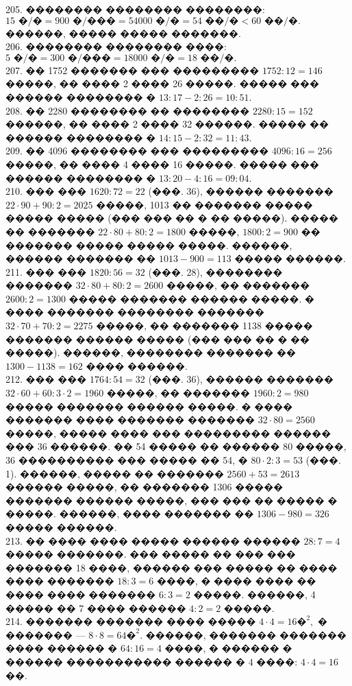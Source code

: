 \documentclass[12pt]{article}
\begin{document}
205. �������� �������� ��������: $15\text{ �/�}=900\text{ �/���}=54000\text{ �/�}=54\text{ ��/�}<60\text{ ��/�}.$ ������, ����� ����� �������.\\
206. �������� �������� ����: $5\text{ �/�}=300\text{ �/���}=18000\text{ �/�}=18\text{ ��/�}.$\\
207. �� 1752 ������� ��� ��������� $1752:12=146$ �����, �� ���� 2 ���� 26 �����. ����� ��� ������ �������� �  $13:17-2:26=10:51.$\\
208. �� 2280 �������� �� �������� $2280:15=152$ ������, �� ���� 2 ���� 32 ������. ����� �� ������ �������� �  $14:15-2:32=11:43.$\\
209. �� 4096 �������� ��� ��������� $4096:16=256$ �����, �� ���� 4 ���� 16 �����. ����� ��� ������ �������� �  $13:20-4:16=09:04.$\\
210. ��� ��� $1620:72=22$ (���. 36), ������ ������� $22\cdot90+90:2=2025$ �����, 1013 �� ������� ����� ����� ����� (��� ��� �� � �� �����). ����� �� ������� $22\cdot80+80:2=1800$ �����, $1800:2=900$ �� ������� ����� ����� �����. ������, ������ ������� �� $1013-900=113$ ����� ������.\\
211. ��� ��� $1820:56=32$ (���. 28), �������� ������� $32\cdot80+80:2=2600$ �����, �� ������� $2600:2=1300$ ����� ������� ������ �����. � ���� ������� �������� ������� $32\cdot70+70:2=2275$ �����, �� ������� 1138 ����� ������� ������ ����� (��� ��� �� � �� �����). ������, �������� ������� �� $1300-1138=162$ ���� ������.\\
212. ��� ��� $1764:54=32$ (���. 36), ������ ������� $32\cdot60+60:3\cdot2=1960$ �����, �� ������� $1960:2=980$ ����� ������� ������ �����. � ���� ������� ���� ������� ������� $32\cdot80=2560$ �����, ����� ���� ��� ��������� ������ ��� 36 ������. �� 54 ����� �� ������ 80 �����, 36 ���������� ��� ����� �� 54, �  $80\cdot2:3=53$ (���. 1). ������, ����� �� ������� $2560+53=2613$ ������ �����, �� ������� 1306 ����� ������� ������ �����, ��� ��� �� ����� � �����. ������, ���� ������� �� $1306-980=326$ ����� ������.\\
213. �� ���� ���� ����� ������ ������ $28:7=4$ ����� �������. ��� ����� �� ��� ��� ������� 18 ����, ������ ��� ����� �� ���� ���� ������� $18:3=6$ ����, � ���� ���� �� ���� ���� ������� $6:3=2$ �����. ������, 4 ����� �� 7 ���� ������ $4:2=2$ �����.\\
214. ������� ������� ���� ����� $4\cdot4=16\text{�}^2,$ � ������� --- $8\cdot8=64\text{�}^2.$ ������, ������� ������� ���� ������ � $64:16=4$ ����, � ������ � ������ ����������� ������ � $4$ ����: $4\cdot4=16$��.\\
\end{document}

